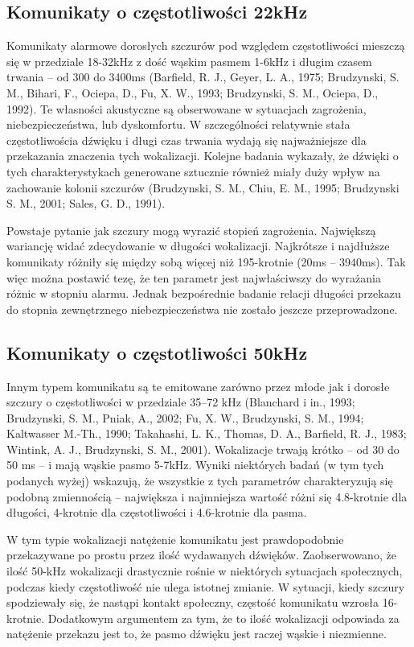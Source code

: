 \documentclass{psychol}
\begin{document}
\subsection{Komunikaty o częstotliwości 22kHz}

Komunikaty alarmowe dorosłych szczurów pod względem częstotliwości mieszczą się w przedziale 18-32kHz z dość wąskim pasmem 1-6kHz i długim czasem trwania -- od 300 do 3400ms (Barfield, R. J., Geyer, L. A., 1975; Brudzynski, S. M., Bihari, F., Ociepa, D., Fu, X. W., 1993; Brudzynski, S. M., Ociepa, D., 1992). Te własności akustyczne są obserwowane w sytuacjach zagrożenia, niebezpieczeństwa, lub dyskomfortu. W szczególności relatywnie stała częstotliwościa dźwięku i długi czas trwania wydają się najważniejsze dla przekazania znaczenia tych wokalizacji. Kolejne badania wykazały, że dźwięki o tych charakterystykach generowane sztucznie również miały duży wpływ na zachowanie kolonii szczurów (Brudzynski, S. M., Chiu, E. M., 1995; Brudzynski S. M., 2001; Sales, G. D., 1991).

Powstaje pytanie jak szczury mogą wyrazić stopień zagrożenia. Największą wariancję widać zdecydowanie w długości wokalizacji. Najkrótsze i najdłuższe komunikaty różniły się między sobą więcej niż 195-krotnie (20ms -- 3940ms). Tak więc można postawić tezę, że ten parametr jest najwłaściwszy do wyrażania różnic w stopniu alarmu. Jednak bezpośrednie badanie relacji długości przekazu do stopnia zewnętrznego niebezpieczeństwa nie zostało jeszcze przeprowadzone. 

\subsection{Komunikaty o częstotliwości 50kHz}

Innym typem komunikatu są te emitowane zarówno przez młode jak i dorosłe szczury o częstotliwości w przedziale 35–72 kHz (Blanchard i in., 1993; Brudzynski, S. M., Pniak, A., 2002; Fu, X. W., Brudzynski, S. M., 1994; Kaltwasser M.-Th., 1990; Takahashi, L. K., Thomas, D. A., Barfield, R. J., 1983; Wintink, A. J., Brudzynski, S. M., 2001). Wokalizacje trwają krótko -- od 30 do 50 ms -- i mają wąskie pasmo 5-7kHz. Wyniki niektórych badań (w tym tych podanych wyżej) wskazują, że wszystkie z tych parametrów charakteryzują się podobną zmiennością -- największa i najmniejsza wartość różni się 4.8-krotnie dla długości, 4-krotnie dla częstotliwości i 4.6-krotnie dla pasma.

W tym typie wokalizacji natężenie komunikatu jest prawdopodobnie przekazywane po prostu przez ilość wydawanych dźwięków. Zaobserwowano, że ilość 50-kHz wokalizacji drastycznie rośnie w niektórych sytuacjach społecznych, podczas kiedy częstotliwość nie ulega istotnej zmianie. W sytuacji, kiedy szczury spodziewały się, że nastąpi kontakt społeczny, częstość komunikatu wzrosła 16-krotnie. Dodatkowym argumentem za tym, że to ilość wokalizacji odpowiada za natężenie przekazu jest to, że pasmo dźwięku jest raczej wąskie i niezmienne.
\end{document}
